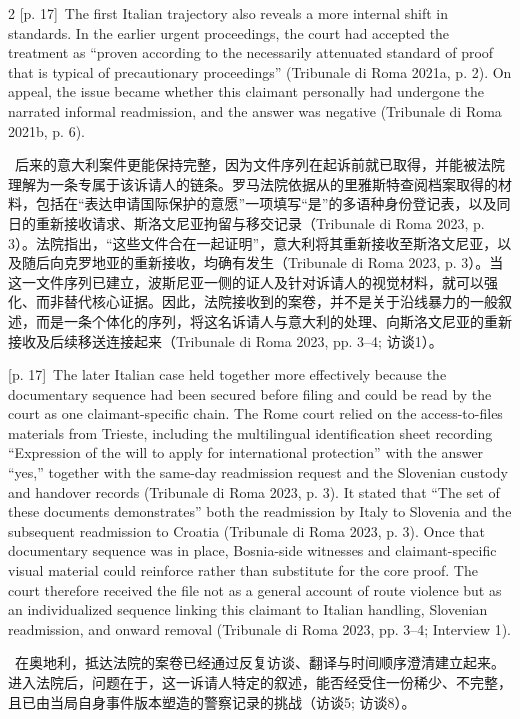 \documentclass[10pt,a4paper]{article}
\begin{document}
\begin{paracol}{2}
\switchcolumn
{\scriptsize\color{gray} [p. 17]}\ The first Italian trajectory also reveals a more internal shift in standards. In the earlier urgent proceedings, the court had accepted the treatment as “proven according to the necessarily attenuated standard of proof that is typical of precautionary proceedings” (Tribunale di Roma 2021a, p. 2). On appeal, the issue became whether this claimant personally had undergone the narrated informal readmission, and the answer was negative (Tribunale di Roma 2021b, p. 6).\par
\switchcolumn*
{\scriptsize\color{gray} [p. 17]}\ 后来的意大利案件更能保持完整，因为文件序列在起诉前就已取得，并能被法院理解为一条专属于该诉请人的链条。罗马法院依据从的里雅斯特查阅档案取得的材料，包括在“表达申请国际保护的意愿”一项填写“是”的多语种身份登记表，以及同日的重新接收请求、斯洛文尼亚拘留与移交记录（Tribunale di Roma 2023, p. 3）。法院指出，“这些文件合在一起证明”，意大利将其重新接收至斯洛文尼亚，以及随后向克罗地亚的重新接收，均确有发生（Tribunale di Roma 2023, p. 3）。当这一文件序列已建立，波斯尼亚一侧的证人及针对诉请人的视觉材料，就可以强化、而非替代核心证据。因此，法院接收到的案卷，并不是关于沿线暴力的一般叙述，而是一条个体化的序列，将这名诉请人与意大利的处理、向斯洛文尼亚的重新接收及后续移送连接起来（Tribunale di Roma 2023, pp. 3–4; 访谈1）。\par
\switchcolumn
{\scriptsize\color{gray} [p. 17]}\ The later Italian case held together more effectively because the documentary sequence had been secured before filing and could be read by the court as one claimant-specific chain. The Rome court relied on the access-to-files materials from Trieste, including the multilingual identification sheet recording “Expression of the will to apply for international protection” with the answer “yes,” together with the same-day readmission request and the Slovenian custody and handover records (Tribunale di Roma 2023, p. 3). It stated that “The set of these documents demonstrates” both the readmission by Italy to Slovenia and the subsequent readmission to Croatia (Tribunale di Roma 2023, p. 3). Once that documentary sequence was in place, Bosnia-side witnesses and claimant-specific visual material could reinforce rather than substitute for the core proof. The court therefore received the file not as a general account of route violence but as an individualized sequence linking this claimant to Italian handling, Slovenian readmission, and onward removal (Tribunale di Roma 2023, pp. 3–4; Interview 1).\par
\switchcolumn*
{\scriptsize\color{gray} [p. 17]}\ 在奥地利，抵达法院的案卷已经通过反复访谈、翻译与时间顺序澄清建立起来。进入法院后，问题在于，这一诉请人特定的叙述，能否经受住一份稀少、不完整，且已由当局自身事件版本塑造的警察记录的挑战（访谈5; 访谈8）。\par

\end{paracol}
\end{document}
